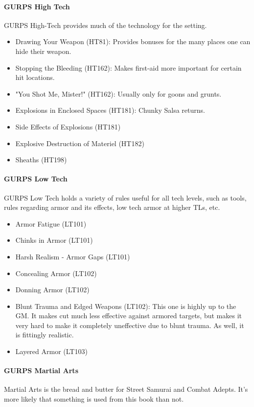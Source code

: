 \begin{multicols*}{3}
	\paragraph{GURPS High Tech}
	GURPS High-Tech provides much of the technology for the setting.
	\begin{itemize}
		\itemsep0em 
		\item Drawing Your Weapon (HT81): Provides bonuses for the many places one can hide their weapon.
		\item Stopping the Bleeding (HT162): Makes first-aid more important for certain hit locations.
		\item "You Shot Me, Mister!" (HT162): Usually only for goons and grunts.
		\item Explosions in Enclosed Spaces (HT181): Chunky Salsa returns.
		\item Side Effects of Explosions (HT181)
		\item Explosive Destruction of Materiel (HT182)
		\item Sheaths (HT198)
	\end{itemize}
	
	\paragraph{GURPS Low Tech}
	GURPS Low Tech holds a variety of rules useful for all tech levels, such as tools, rules regarding armor and its effects, low tech armor at higher TLs, etc.
	
	\begin{itemize}
		\itemsep0em 
		\item Armor Fatigue (LT101)
		\item Chinks in Armor (LT101)
		\item Harsh Realism - Armor Gaps (LT101)
		\item Concealing Armor (LT102)
		\item Donning Armor (LT102)
		\item Blunt Trauma and Edged Weapons (LT102): This one is highly up to the GM. It makes cut much less effective against armored targets, but makes it very hard to make it completely uneffective due to blunt trauma. As well, it is fittingly realistic.
		\item Layered Armor (LT103)
	\end{itemize}
	
	\paragraph{GURPS Martial Arts}
	Martial Arts is the bread and butter for Street Samurai and Combat Adepts. It's more likely that something is used from this book than not.
	

\end{multicols*}
